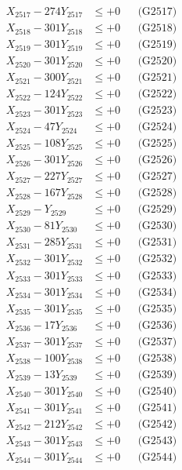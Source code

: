 \documentclass[a4paper,10pt]{article}
\begin{document}
{\begin{align}
X_{2517} - 274Y_{2517} &\leq +0 && \text{(G2517)} \\
X_{2518} - 301Y_{2518} &\leq +0 && \text{(G2518)} \\
X_{2519} - 301Y_{2519} &\leq +0 && \text{(G2519)} \\
X_{2520} - 301Y_{2520} &\leq +0 && \text{(G2520)} \\
\allowbreak
X_{2521} - 300Y_{2521} &\leq +0 && \text{(G2521)} \\
X_{2522} - 124Y_{2522} &\leq +0 && \text{(G2522)} \\
X_{2523} - 301Y_{2523} &\leq +0 && \text{(G2523)} \\
X_{2524} - 47Y_{2524} &\leq +0 && \text{(G2524)} \\
X_{2525} - 108Y_{2525} &\leq +0 && \text{(G2525)} \\
X_{2526} - 301Y_{2526} &\leq +0 && \text{(G2526)} \\
X_{2527} - 227Y_{2527} &\leq +0 && \text{(G2527)} \\
X_{2528} - 167Y_{2528} &\leq +0 && \text{(G2528)} \\
X_{2529} - Y_{2529} &\leq +0 && \text{(G2529)} \\
X_{2530} - 81Y_{2530} &\leq +0 && \text{(G2530)} \\
\allowbreak
X_{2531} - 285Y_{2531} &\leq +0 && \text{(G2531)} \\
X_{2532} - 301Y_{2532} &\leq +0 && \text{(G2532)} \\
X_{2533} - 301Y_{2533} &\leq +0 && \text{(G2533)} \\
X_{2534} - 301Y_{2534} &\leq +0 && \text{(G2534)} \\
X_{2535} - 301Y_{2535} &\leq +0 && \text{(G2535)} \\
X_{2536} - 17Y_{2536} &\leq +0 && \text{(G2536)} \\
X_{2537} - 301Y_{2537} &\leq +0 && \text{(G2537)} \\
X_{2538} - 100Y_{2538} &\leq +0 && \text{(G2538)} \\
X_{2539} - 13Y_{2539} &\leq +0 && \text{(G2539)} \\
X_{2540} - 301Y_{2540} &\leq +0 && \text{(G2540)} \\
\allowbreak
X_{2541} - 301Y_{2541} &\leq +0 && \text{(G2541)} \\
X_{2542} - 212Y_{2542} &\leq +0 && \text{(G2542)} \\
X_{2543} - 301Y_{2543} &\leq +0 && \text{(G2543)} \\
X_{2544} - 301Y_{2544} &\leq +0 && \text{(G2544)} \\

\end{align}}
\end{document}
